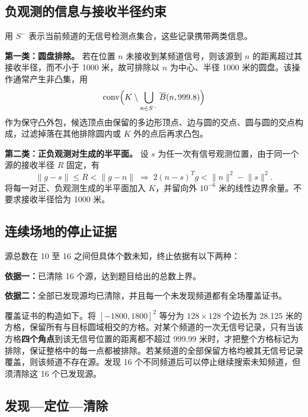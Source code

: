 \documentclass[UTF8,a4paper,zihao=-4,fontset=none]{ctexart}
\begin{document}
\subsection{负观测的信息与接收半径约束}

用 \(S^-\) 表示当前频道的无信号检测点集合，这些记录携带两类信息。

\textbf{第一类：圆盘排除。} 若在位置 \(n\) 未接收到某频道信号，则该源到 \(n\) 的距离超过其接收半径，而不小于 1000 米，故可排除以 \(n\) 为中心、半径 1000 米的圆盘。该操作通常产生非凸集，用
\begin{equation}
  \operatorname{conv}\Bigl(K\setminus\bigcup_{n\in S^-}\overline{B}(n,999.8)\Bigr)
  \label{eq:q3-disk}
\end{equation}
作为保守凸外包，候选顶点由保留的多边形顶点、边与圆的交点、圆与圆的交点构成，过滤掉落在其他排除圆内或 \(K\) 外的点后再求凸包。

\textbf{第二类：正负观测对生成的半平面。} 设 \(s\) 为任一次有信号观测位置，由于同一个源的接收半径 \(R\) 固定，有
\begin{equation}
  \lVert g-s\rVert\le R<\lVert g-n\rVert
  \;\Longrightarrow\;
  2(n-s)^{T}g<\lVert n\rVert^{2}-\lVert s\rVert^{2}.
  \label{eq:q3-halfplane}
\end{equation}
将每一对正、负观测生成的半平面加入 \(K\)，并留向外 \(10^{-6}\) 米的线性边界余量。不要求接收半径恰为 1000 米。

\subsection{连续场地的停止证据}

源总数在 10 至 16 之间但具体个数未知，终止依据有以下两种：

\textbf{依据一：}已清除 16 个源，达到题目给出的总数上界。

\textbf{依据二：}全部已发现源均已清除，并且每一个未发现频道都有全场覆盖证书。

覆盖证书的构造如下。将 \([-1800,1800]^2\) 等分为 \(128\times128\) 个边长为 28.125 米的方格，保留所有与目标圆域相交的方格。对某个频道的一次无信号记录，只有当该方格\textbf{四个角点}到该无信号位置的距离都不超过 999.99 米时，才把整个方格标记为排除，保证整格中的每一点都被排除。若某频道的全部保留方格均被其无信号记录覆盖，则该频道不存在源。发现 16 个不同频道后可以停止继续搜索未知频道，但须清除这 16 个已发现源。

\subsection{发现—定位—清除}
\end{document}
